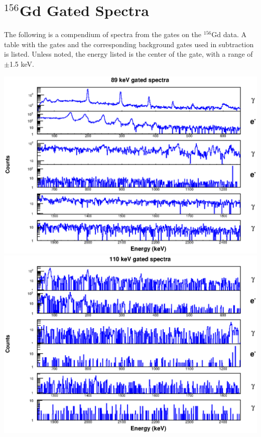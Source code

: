 \chapter{$^{156}$Gd Gated Spectra}
\label{chap:156_spectra}

The following is a compendium of spectra from the gates on the $^{156}$Gd data. A table with the gates and the corresponding background gates used in subtraction is listed. Unless noted, the energy listed is the center of the gate, with a range of $\pm$1.5 keV.



\includegraphics[scale=0.8]{156Gd_Appendix/89_combined.eps}
\includegraphics[scale=0.8]{156Gd_Appendix/110_combined.eps}
